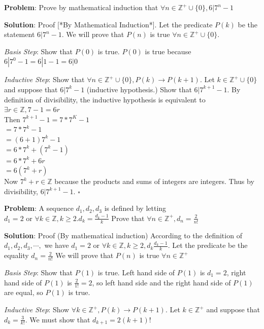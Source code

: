 \documentclass[12pt]{minimal}
\begin{document}
\textbf{Problem}: Prove by mathematical induction that $\forall n \in \mathbb{Z}^+ \cup \{0\}, 6 | 7^n - 1$

\textbf{Solution}: Proof [*By Mathematical Induction*].
Let the predicate $P(k)$ be the statement $6 | 7^n - 1$. We will prove that $P(n)$ is true $\forall n \in \mathbb{Z}^+ \cup \{0\}$.

\textit{Basis Step}: Show that $P(0)$ is true. $P(0)$ is true because $6 | 7^0 -1 = 6 | 1-1 = 6 | 0$

\textit{Inductive Step}: Show that $\forall n \in \mathbb{Z}^+ \cup \{0\}, P(k) \rightarrow P(k + 1) $.
Let $k \in \mathbb{Z}^+ \cup \{0\}$ and suppose that $6 | 7^k - 1$ (inductive hypothesis.)
Show that $6 | 7^{k+1} - 1$.
By definition of divisibility, the inductive hypothesis is equivalent to $\exists r \in \mathbb{Z}, 7 - 1 = 6r$ \\

\noindent
Then $7^{k+1} - 1 = 7 * 7^K - 1$ \\
$= 7 * 7^k - 1 $ \\
$= (6 + 1)7^k - 1$ \\
$= 6 * 7^k + (7^k - 1)$ \\
$= 6 * 7^k + 6r$ \\
$= 6(7^k + r)$ \\

Now $7^k + r \in \mathbb{Z}$ because the products and sums of integers are integers. Thus by divisibility, $6 | 7^{k + 1} - 1$. $\square$

\textbf{Problem}: A sequence $d_1, d_2, d_3$ is defined by letting $d_1 = 2 \text{ or } \forall k \in \mathbb{Z}, k ≥ 2. d_k = \frac{d_k - 1}{k}$ Prove that $\forall n \in \mathbb{Z}^+, d_n = \frac{2}{n!}$

\textbf{Solution}: Proof (By mathematical induction)
According to the definition of  $d_1, d_2, d_3, \cdots,$ we have  $d_1 = 2 \text{ or } \forall k \in \mathbb{Z}, k ≥ 2, d_k \frac{d_k - 1}{k} $.
Let the predicate be the equality $d_n = \frac{2}{n!}$
We will prove that $P(n)$ is true $\forall n \in \mathbb{Z}^+$

\textit{Basis Step}: Show that $P(1)$ is true. Left hand side of $P(1)$ is $d_1 = 2$, right hand side of $P(1)$ is $\frac{2}{1!} = 2$, so left hand side and the right hand side of $P(1)$ are equal, so $P(1)$ is true.

\textit{Inductive Step}: Show $\forall k \in \mathbb{Z}^+, P(k) \rightarrow P(k + 1).$
Let $k \in \mathbb{Z}^+$ and suppose that $d_k = \frac{3}{k!}$.
We must show that $d_{k+1} = {2}{(k+1)!}$
\end{document}
